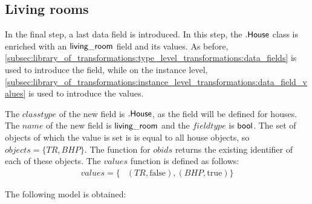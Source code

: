 \subsection{Living rooms}
\label{sec:application:building_the_model:living_rooms}

In the final step, a last data field is introduced. In this step, the $.\mathsf{House}$ class is enriched with an $\mathsf{living\_room}$ field and its values. As before, \cref{subsec:library_of_transformations:type_level_transformations:data_fields} is used to introduce the field, while on the instance level, \cref{subsec:library_of_transformations:instance_level_transformations:data_field_values} is used to introduce the values.

The $classtype$ of the new field is $.\mathsf{House}$, as the field will be defined for houses. The $name$ of the new field is $\mathsf{living\_room}$ and the $fieldtype$ is $\mathsf{bool}$. The set of objects of which the value is set is is equal to all house objects, so $objects = \{TR, BHP\}$. The function for $obids$ returns the existing identifier of each of these objects. The $values$ function is defined as follows:
\begin{align*}
    values = \{&(TR, \text{false}), (BHP, \text{true})\}
\end{align*}

The following model is obtained:


